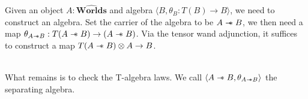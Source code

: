 \documentclass{article}
\newcommand{\sep}{\mathrel{-\mkern-6mu*}}
\newcommand{\worlds}{\widehat{\mathbf{Worlds}}}
\begin{document}
Given an object $A : \worlds$ and algebra $\langle B , \theta_B : T(B) \rightarrow B\rangle$, we need to construct an algebra. Set the carrier of the algebra to be $A \sep B$, we then need a map $\theta_{A\sep B} : T(A \sep B) \rightarrow (A \sep B)$. Via the tensor wand adjunction, it suffices to construct a map $T(A \sep B)\otimes A \rightarrow B$.
\begin{figure}[!ht]
\centering
{}
\end{figure}
\\
What remains is to check the T-algebra laws. We call $\langle A \sep B , \theta_{A \sep B}\rangle$ the separating algebra.

\newpage
\end{document}

